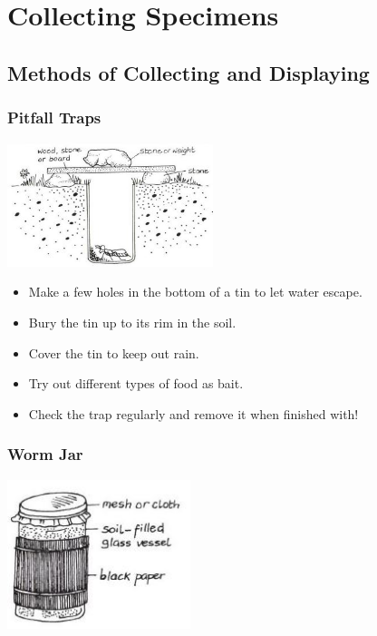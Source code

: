 \chapter{Collecting Specimens} %


\section{Methods of Collecting and Displaying}

\begin{multicols}{2}

\subsection{Pitfall Traps}

\begin{center}
\includegraphics[width=0.45\textwidth]{./img/vso/pitfall.jpg}
\end{center}

\begin{itemize}
\item Make a few holes in the bottom
of a tin to let water escape.
\item Bury the tin up to its rim in the
soil.
\item Cover the tin to keep out rain.
\item Try out different types of food
as bait.
\item Check the trap regularly and
remove it when finished with!
\end{itemize}


\subsection{Worm Jar}

\begin{center}
\includegraphics[width=0.4\textwidth]{./img/vso/worm-jar.jpg}
\end{center}


\end{multicols}
